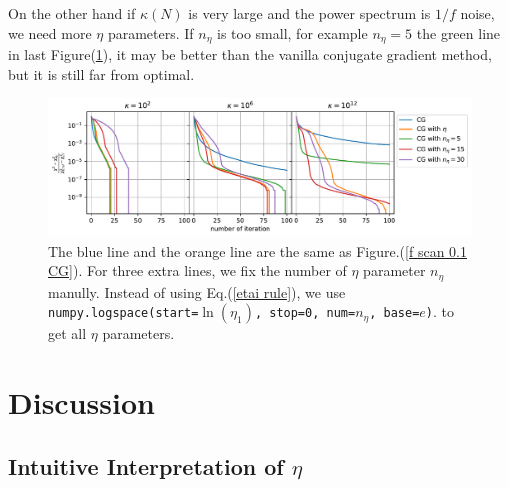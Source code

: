 \documentclass[twocolumn,linenumbers]{aastex631}
\begin{document}
On the other hand if $\kappa(N)$ is very large and the power spectrum is $1/f$
noise, we need more $\eta$ parameters.
If $n_{\eta}$ is too small, for example $n_{\eta}=5$ the green line in
last Figure(\ref{f scan 0.1}), it may be better than the vanilla conjugate
gradient method, but it is still far from optimal.


\begin{figure}[htb!]
\centering
\includegraphics[width=\textwidth]{f_scan=0.1.pdf}
\caption{The blue line and the orange line are the same as Figure.(\ref{f scan 0.1 CG}).
For three extra lines, we fix the number of $\eta$ parameter $n_{\eta}$ manully.
Instead of using Eq.(\ref{etai rule}), we use
\texttt{numpy.logspace(start=$\ln(\eta_1)$, stop=0, num=$n_{\eta}$, base=$e$)}.
to get all $\eta$ parameters. 
}
\label{f scan 0.1}
\end{figure}


%

\section{Discussion} \label{sec:discussion}

\subsection{Intuitive Interpretation of $\eta$}\label{intuitive interp}
\end{document}
